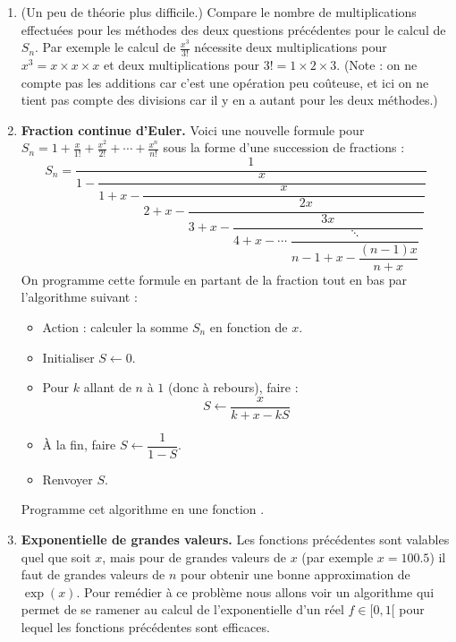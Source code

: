 \documentclass[11pt,class=report,crop=false]{standalone}
\begin{document}
\begin{activite}
\begin{enumerate}
   \item (Un peu de théorie plus difficile.)  Compare le nombre de multiplications effectuées pour les méthodes des deux questions précédentes pour le calcul de $S_n$. Par exemple le calcul de $\frac{x^3}{3!}$ nécessite deux multiplications pour $x^3 = x \times x \times x$ et deux multiplications pour $3! = 1 \times 2 \times 3$. (Note : on ne compte pas les additions car c'est une opération peu coûteuse, et ici on ne tient pas compte des divisions car il y en a autant pour les deux méthodes.)


  \item \textbf{Fraction continue d'Euler.}
  Voici une nouvelle formule pour $S_n = 1 + \frac{x}{1!} + \frac{x^2}{2!}+ \cdots + \frac{x^n}{n!}$ sous la forme d'une succession de fractions :
$$S_n = 
\dfrac{1}{
  1-\dfrac{x}{
    1+x-\dfrac{x}{
      2+x-\dfrac{2x}{
        3+x-\dfrac{3x}{
          4+x - \cdots  \dfrac{\ddots}{n-1 + x  - \dfrac{(n-1)x}{n+x}}
                     }
                   }
                }
            } 
          } 
$$  
On programme cette formule en partant de la fraction tout en bas par l'algorithme suivant :
  \begin{algorithme}
  \sauteligne 
 \begin{itemize}
   \item Action : calculer la somme $S_n$ en fonction de $x$.
  
  \item Initialiser $S \leftarrow 0$.
  
  \item Pour $k$ allant de $n$ à $1$ (donc à rebours), faire :
     $$S \leftarrow \dfrac{x}{k+x-kS}$$ 
 
  \item \`A la fin, faire $S \leftarrow \dfrac{1}{1-S}$.
  
  \item Renvoyer $S$.
 \end{itemize}  
 \end{algorithme}
  
  Programme cet algorithme en une fonction .
  
\item \textbf{Exponentielle de grandes valeurs.}
  Les fonctions précédentes sont valables quel que soit $x$, mais pour de grandes valeurs de $x$ (par exemple $x=100.5$) il faut de grandes valeurs de $n$ pour obtenir une bonne approximation de $\exp(x)$. Pour remédier à ce problème nous allons voir un algorithme qui permet de se ramener au calcul de l'exponentielle d'un réel $f \in [0,1[$ pour lequel les fonctions précédentes sont efficaces.
  

\end{enumerate}
\end{activite}
\end{document}
